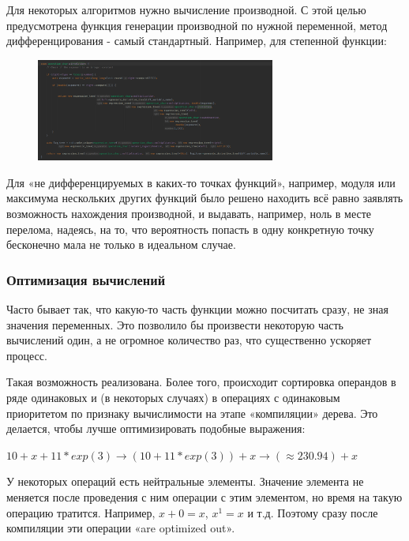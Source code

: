 \documentclass[11pt]{article}
\begin{document}
    Для некоторых алгоритмов нужно вычисление производной.
    С этой целью предусмотрена функция генерации производной по нужной переменной, метод дифференцирования - самый стандартный.
    Например, для степенной функции:
    \begin{figure}[h]
        \centering
        \includegraphics[width=0.7\textwidth]{involution_derivative.png}
        \label{fig:involution-derivative}
    \end{figure}
    \FloatBarrier

    Для «не дифференцируемых в каких-то точках функций», например,
    модуля или максимума нескольких других функций было решено находить всё равно заявлять возможность нахождения производной,
    и выдавать, например, ноль в месте перелома, надеясь, на то,
    что вероятность попасть в одну конкретную точку бесконечно мала не только в идеальном случае.

    \subsubsection{Оптимизация вычислений}
    Часто бывает так, что какую-то часть функции можно посчитать сразу, не зная значения переменных.
    Это позволило бы произвести некоторую часть вычислений один, а не огромное количество раз, что существенно ускоряет процесс.

    Такая возможность реализована.
    Более того, происходит сортировка операндов в ряде одинаковых и (в некоторых случаях) в операциях с одинаковым приоритетом
    по признаку вычислимости на этапе «компиляции» дерева.
    Это делается, чтобы лучше оптимизировать подобные выражения:

    $10 + x + 11 * exp(3) \longrightarrow (10 + 11 * exp(3)) + x \longrightarrow (\approx 230.94) + x$

    У некоторых операций есть нейтральные элементы.
    Значение элемента не меняется после проведения с ним операции с этим элементом,
    но время на такую операцию тратится.
    Например, $x + 0 = x$, $x^1 = x$ и т.д.
    Поэтому сразу после компиляции эти операции «are optimized out».
\end{document}
